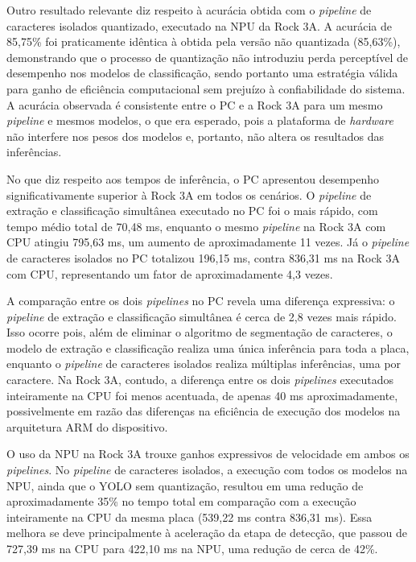 Outro resultado relevante diz respeito à acurácia obtida com o \textit{pipeline} de caracteres isolados quantizado, executado na NPU da Rock 3A. A acurácia de 85,75\% foi praticamente idêntica à obtida pela versão não quantizada (85,63\%), demonstrando que o processo de quantização não introduziu perda perceptível de desempenho nos modelos de classificação, sendo portanto uma estratégia válida para ganho de eficiência computacional sem prejuízo à confiabilidade do sistema.
A acurácia observada é consistente entre o PC e a Rock 3A para um mesmo \textit{pipeline} e mesmos modelos, o que era esperado, pois a plataforma de \textit{hardware} não interfere nos pesos dos modelos e, portanto, não altera os resultados das inferências.

No que diz respeito aos tempos de inferência, o PC apresentou desempenho significativamente superior à Rock 3A em todos os cenários. O \textit{pipeline} de extração e classificação simultânea executado no PC foi o mais rápido, com tempo médio total de 70,48 ms, enquanto o mesmo \textit{pipeline} na Rock 3A com CPU atingiu 795,63 ms, um aumento de aproximadamente 11 vezes. Já o \textit{pipeline} de caracteres isolados no PC totalizou 196,15 ms, contra 836,31 ms na Rock 3A com CPU, representando um fator de aproximadamente 4,3 vezes.

A comparação entre os dois \textit{pipelines} no PC revela uma diferença expressiva: o \textit{pipeline} de extração e classificação simultânea é cerca de 2,8 vezes mais rápido. Isso ocorre pois, além de eliminar o algoritmo de segmentação de caracteres, o modelo de extração e classificação realiza uma única inferência para toda a placa, enquanto o \textit{pipeline} de caracteres isolados realiza múltiplas inferências, uma por caractere. Na Rock 3A, contudo, a diferença entre os dois \textit{pipelines} executados inteiramente na CPU foi menos acentuada, de apenas 40 ms aproximadamente, possivelmente em razão das diferenças na eficiência de execução dos modelos na arquitetura ARM do dispositivo.

O uso da NPU na Rock 3A trouxe ganhos expressivos de velocidade em ambos os \textit{pipelines}. No \textit{pipeline} de caracteres isolados, a execução com todos os modelos na NPU, ainda que o YOLO sem quantização, resultou em uma redução de aproximadamente 35\% no tempo total em comparação com a execução inteiramente na CPU da mesma placa (539,22 ms contra 836,31 ms). Essa melhora se deve principalmente à aceleração da etapa de detecção, que passou de 727,39 ms na CPU para 422,10 ms na NPU, uma redução de cerca de 42\%.


